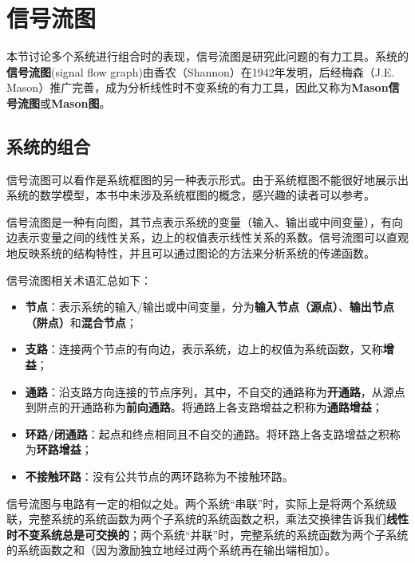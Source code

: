 \section{信号流图}\label{sec:Signal_Flow_Graph}

本节讨论多个系统进行组合时的表现，信号流图是研究此问题的有力工具。系统的\textbf{信号流图}(signal flow graph)由香农（Shannon）在1942年发明，后经梅森（J.E. Mason）推广完善，成为分析线性时不变系统的有力工具，因此又称为\textbf{Mason信号流图}或\textbf{Mason图}。

\subsection{系统的组合}\label{sub:system_comb}

信号流图可以看作是系统框图的另一种表示形式。由于系统框图不能很好地展示出系统的数学模型，本书中未涉及系统框图的概念，感兴趣的读者可以参考\cite{oppenheim1997signals}\cite{signal_systems}。

\begin{definition}
    信号流图是一种有向图，其节点表示系统的变量（输入、输出或中间变量），有向边表示变量之间的线性关系，边上的权值表示线性关系的系数。信号流图可以直观地反映系统的结构特性，并且可以通过图论的方法来分析系统的传递函数。

    信号流图相关术语汇总如下：
    \begin{itemize}
        \item \textbf{节点}：表示系统的输入/输出或中间变量，分为\textbf{输入节点（源点）}、\textbf{输出节点（阱点）}和\textbf{混合节点}；
        \item \textbf{支路}：连接两个节点的有向边，表示系统，边上的权值为系统函数，又称\textbf{增益}；
        \item \textbf{通路}：沿支路方向连接的节点序列，其中，不自交的通路称为\textbf{开通路}，从源点到阱点的开通路称为\textbf{前向通路}。将通路上各支路增益之积称为\textbf{通路增益}；
        \item \textbf{环路/闭通路}：起点和终点相同且不自交的通路。将环路上各支路增益之积称为\textbf{环路增益}；
        \item \textbf{不接触环路}：没有公共节点的两环路称为不接触环路。
    \end{itemize}
\end{definition}

信号流图与电路有一定的相似之处。两个系统“串联”时，实际上是将两个系统级联，完整系统的系统函数为两个子系统的系统函数之积，乘法交换律告诉我们\textbf{线性时不变系统总是可交换的}；两个系统“并联”时，完整系统的系统函数为两个子系统的系统函数之和（因为激励独立地经过两个系统再在输出端相加）。

